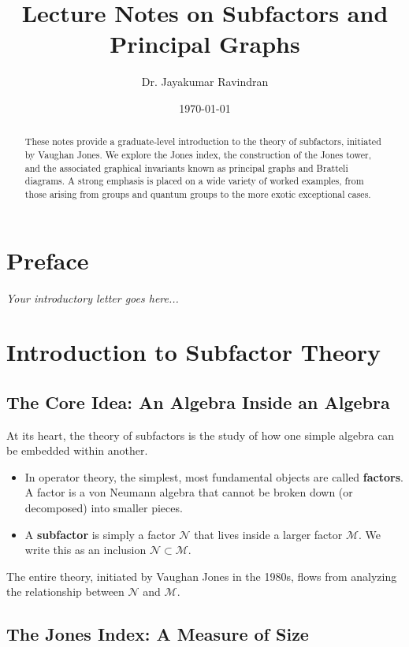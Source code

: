 \documentclass[11pt, a4paper]{article}
\author{Dr. Jayakumar Ravindran}
\title{\textbf{Lecture Notes on Subfactors and Principal Graphs}}
\date{\today}
\theoremstyle{colored_def}
\theoremstyle{colored_thm}
\theoremstyle{colored_ex}
\begin{document}
\maketitle

\begin{abstract}
These notes provide a graduate-level introduction to the theory of subfactors, initiated by Vaughan Jones. We explore the Jones index, the construction of the Jones tower, and the associated graphical invariants known as principal graphs and Bratteli diagrams. A strong emphasis is placed on a wide variety of worked examples, from those arising from groups and quantum groups to the more exotic exceptional cases.
\end{abstract}

\section*{Preface}
\textit{Your introductory letter goes here...}

\tableofcontents

\section{Introduction to Subfactor Theory}

\subsection{The Core Idea: An Algebra Inside an Algebra}

At its heart, the theory of subfactors is the study of how one simple algebra can be embedded within another.

\begin{itemize}
    \item In operator theory, the simplest, most fundamental objects are called \textbf{factors}. A factor is a von Neumann algebra that cannot be broken down (or decomposed) into smaller pieces. 
    \item A \textbf{subfactor} is simply a factor $\mathcal{N}$ that lives inside a larger factor $\mathcal{M}$. We write this as an inclusion $\mathcal{N} \subset \mathcal{M}$.
\end{itemize}

The entire theory, initiated by Vaughan Jones in the 1980s, flows from analyzing the relationship between $\mathcal{N}$ and $\mathcal{M}$.

\subsection{The Jones Index: A Measure of Size}
\end{document}
